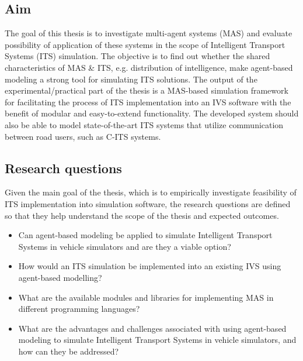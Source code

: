 \documentclass[titlepage, 12pt]{article}
\begin{document}
\subsection{Aim}

The goal of this thesis is to investigate multi-agent systems (MAS) and evaluate possibility of
application of these systems in the scope of Intelligent Transport Systems (ITS) simulation.
The objective is to find out whether the shared characteristics of MAS \& ITS, e.g.
distribution of intelligence, make agent-based modeling a strong tool for simulating ITS
solutions. The output of the experimental/practical part of the thesis is a MAS-based
simulation framework for facilitating the process of ITS implementation into an IVS software with the benefit
of modular and easy-to-extend functionality. The developed system should also be able to model
state-of-the-art ITS systems that utilize communication between road users, such as C-ITS
systems. 

 \subsection{Research questions}

Given the main goal of the thesis, which is to empirically investigate feasibility of ITS implementation into 
simulation software, the research questions are defined so that they help understand the scope of the thesis and 
expected outcomes. 


\begin{itemize}
    \item Can agent-based modeling be applied to simulate Intelligent Transport Systems in vehicle simulators and are they a viable option?
    \item How would an ITS simulation be implemented into an existing IVS using agent-based modelling?
    \item What are the available modules and libraries for implementing MAS in different programming languages?
    \item What are the advantages and challenges associated with using agent-based modeling to simulate Intelligent Transport Systems in vehicle simulators, and how can they be addressed?
\end{itemize}
\end{document}

